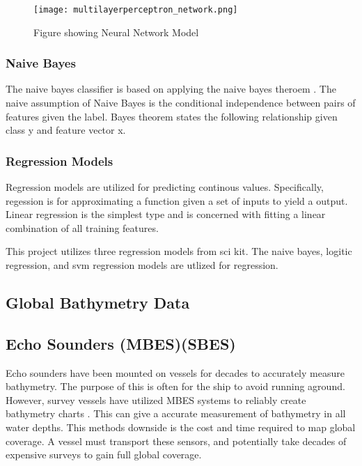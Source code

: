 \begin{figure}[h]
    \centering
    \texttt{[image: multilayerperceptron\_network.png]}
    \caption{Figure showing Neural Network Model}
    \label{}
\end{figure}



\subsubsection{Naive Bayes}
The naive bayes classifier is based on applying the naive bayes theroem \cite{zhang2004optimality}.
The naive assumption of Naive Bayes is the conditional independence between pairs of features given the label.
Bayes theorem states the following relationship given class y and feature vector x.



\subsubsection{Regression Models}
Regression models are utilized for predicting continous values.
Specifically, regession is for approximating a function given a set of inputs to yield a output.
Linear regression is the simplest type and is concerned with fitting a linear combination of all training features.


This project utilizes three regression models from sci kit.
The naive bayes\cite{sklearn_api}, logitic regression\cite{sklearn_api}, and svm regression\cite{sklearn_api} models are utlized for regression.

\subsection{Global Bathymetry Data}

\subsection{Echo Sounders (\ac{MBES})(\ac{SBES}) }
Echo sounders have been mounted on vessels for decades to accurately measure bathymetry.
The purpose of this is often for the ship to avoid running aground.
However, survey vessels have utilized \ac{MBES} systems to reliably create bathymetry charts \cite{farr1980multibeam}.
This can give a accurate measurement of bathymetry in all water depths.
This methods downside is the cost and time required to map global coverage.
A vessel must transport these sensors, and potentially take decades of expensive surveys to gain full global coverage.

